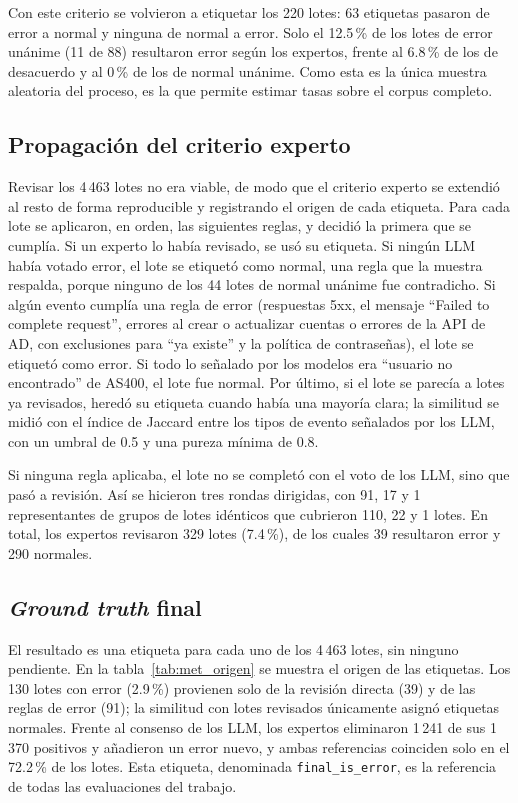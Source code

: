 Con este criterio se volvieron a etiquetar los 220 lotes: 63 etiquetas pasaron de error a normal y ninguna de normal a error. Solo el 12.5\,\% de los lotes de error unánime (11 de 88) resultaron error según los expertos, frente al 6.8\,\% de los de desacuerdo y al 0\,\% de los de normal unánime. Como esta es la única muestra aleatoria del proceso, es la que permite estimar tasas sobre el corpus completo.

\subsection{Propagación del criterio experto}\label{subsec:met_propagacion}

Revisar los 4\,463 lotes no era viable, de modo que el criterio experto se extendió al resto de forma reproducible y registrando el origen de cada etiqueta. Para cada lote se aplicaron, en orden, las siguientes reglas, y decidió la primera que se cumplía. Si un experto lo había revisado, se usó su etiqueta. Si ningún LLM había votado error, el lote se etiquetó como normal, una regla que la muestra respalda, porque ninguno de los 44 lotes de normal unánime fue contradicho. Si algún evento cumplía una regla de error (respuestas 5xx, el mensaje ``Failed to complete request'', errores al crear o actualizar cuentas o errores de la API de AD, con exclusiones para ``ya existe'' y la política de contraseñas), el lote se etiquetó como error. Si todo lo señalado por los modelos era ``usuario no encontrado'' de AS400, el lote fue normal. Por último, si el lote se parecía a lotes ya revisados, heredó su etiqueta cuando había una mayoría clara; la similitud se midió con el índice de Jaccard entre los tipos de evento señalados por los LLM, con un umbral de 0.5 y una pureza mínima de 0.8.

Si ninguna regla aplicaba, el lote no se completó con el voto de los LLM, sino que pasó a revisión. Así se hicieron tres rondas dirigidas, con 91, 17 y 1 representantes de grupos de lotes idénticos que cubrieron 110, 22 y 1 lotes. En total, los expertos revisaron 329 lotes (7.4\,\%), de los cuales 39 resultaron error y 290 normales.

\subsection{\textit{Ground truth} final}

El resultado es una etiqueta para cada uno de los 4\,463 lotes, sin ninguno pendiente. En la tabla~\ref{tab:met_origen} se muestra el origen de las etiquetas. Los 130 lotes con error (2.9\,\%) provienen solo de la revisión directa (39) y de las reglas de error (91); la similitud con lotes revisados únicamente asignó etiquetas normales. Frente al consenso de los LLM, los expertos eliminaron 1\,241 de sus 1\,370 positivos y añadieron un error nuevo, y ambas referencias coinciden solo en el 72.2\,\% de los lotes. Esta etiqueta, denominada \texttt{final\_is\_error}, es la referencia de todas las evaluaciones del trabajo.

